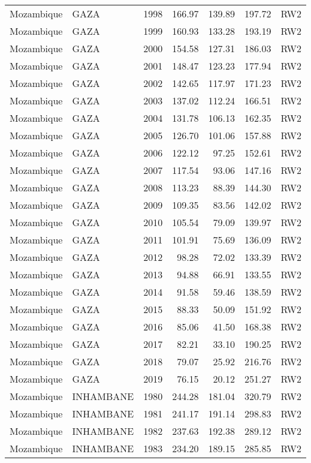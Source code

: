 \begin{longtable}{lllrrrl}
  Mozambique & GAZA & 1998 & 166.97 & 139.89 & 197.72 & RW2 \\ 
  Mozambique & GAZA & 1999 & 160.93 & 133.28 & 193.19 & RW2 \\ 
  Mozambique & GAZA & 2000 & 154.58 & 127.31 & 186.03 & RW2 \\ 
  Mozambique & GAZA & 2001 & 148.47 & 123.23 & 177.94 & RW2 \\ 
  Mozambique & GAZA & 2002 & 142.65 & 117.97 & 171.23 & RW2 \\ 
  Mozambique & GAZA & 2003 & 137.02 & 112.24 & 166.51 & RW2 \\ 
  Mozambique & GAZA & 2004 & 131.78 & 106.13 & 162.35 & RW2 \\ 
  Mozambique & GAZA & 2005 & 126.70 & 101.06 & 157.88 & RW2 \\ 
  Mozambique & GAZA & 2006 & 122.12 & 97.25 & 152.61 & RW2 \\ 
  Mozambique & GAZA & 2007 & 117.54 & 93.06 & 147.16 & RW2 \\ 
  Mozambique & GAZA & 2008 & 113.23 & 88.39 & 144.30 & RW2 \\ 
  Mozambique & GAZA & 2009 & 109.35 & 83.56 & 142.02 & RW2 \\ 
  Mozambique & GAZA & 2010 & 105.54 & 79.09 & 139.97 & RW2 \\ 
  Mozambique & GAZA & 2011 & 101.91 & 75.69 & 136.09 & RW2 \\ 
  Mozambique & GAZA & 2012 & 98.28 & 72.02 & 133.39 & RW2 \\ 
  Mozambique & GAZA & 2013 & 94.88 & 66.91 & 133.55 & RW2 \\ 
  Mozambique & GAZA & 2014 & 91.58 & 59.46 & 138.59 & RW2 \\ 
  Mozambique & GAZA & 2015 & 88.33 & 50.09 & 151.92 & RW2 \\ 
  Mozambique & GAZA & 2016 & 85.06 & 41.50 & 168.38 & RW2 \\ 
  Mozambique & GAZA & 2017 & 82.21 & 33.10 & 190.25 & RW2 \\ 
  Mozambique & GAZA & 2018 & 79.07 & 25.92 & 216.76 & RW2 \\ 
  Mozambique & GAZA & 2019 & 76.15 & 20.12 & 251.27 & RW2 \\ 
  Mozambique & INHAMBANE & 1980 & 244.28 & 181.04 & 320.79 & RW2 \\ 
  Mozambique & INHAMBANE & 1981 & 241.17 & 191.14 & 298.83 & RW2 \\ 
  Mozambique & INHAMBANE & 1982 & 237.63 & 192.38 & 289.12 & RW2 \\ 
  Mozambique & INHAMBANE & 1983 & 234.20 & 189.15 & 285.85 & RW2 \\ 

\end{longtable}
